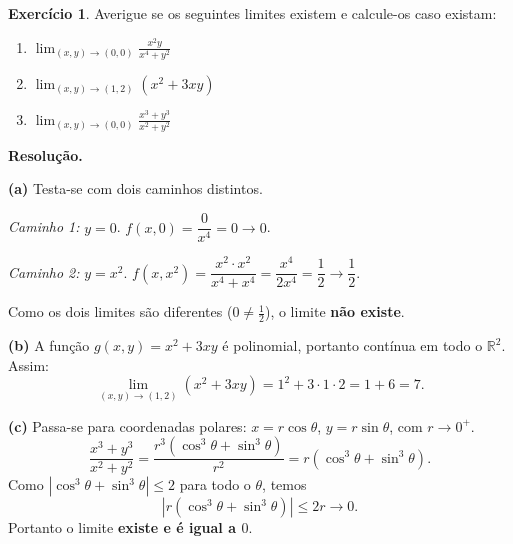 \documentclass[12pt,a4paper]{article}
\theoremstyle{definition}
\newtheorem{exercise}{Exercício}[section]
\theoremstyle{remark}
\begin{document}
\begin{exercise}
  Averigue se os seguintes limites existem e calcule-os caso existam:
  \begin{enumerate}[label=(\alph*)]
    \item $\displaystyle\lim_{(x,y)\to(0,0)}\frac{x^2 y}{x^4+y^2}$
    \item $\displaystyle\lim_{(x,y)\to(1,2)}(x^2+3xy)$
    \item $\displaystyle\lim_{(x,y)\to(0,0)}\frac{x^3+y^3}{x^2+y^2}$
  \end{enumerate}

  \medskip\textbf{Resolução.}

  \textbf{(a)} Testa-se com dois caminhos distintos.

  \emph{Caminho 1:} $y=0$. $f(x,0)=\dfrac{0}{x^4}=0\to 0$.

  \emph{Caminho 2:} $y=x^2$. $f(x,x^2)=\dfrac{x^2\cdot x^2}{x^4+x^4}=\dfrac{x^4}{2x^4}=\dfrac{1}{2}\to\dfrac{1}{2}$.

  Como os dois limites são diferentes ($0\neq\tfrac{1}{2}$), o limite
  \textbf{não existe}.

  \textbf{(b)} A função $g(x,y)=x^2+3xy$ é polinomial, portanto contínua em
  todo o $\mathbb{R}^2$. Assim:
  \[
    \lim_{(x,y)\to(1,2)}(x^2+3xy) = 1^2+3\cdot 1\cdot 2 = 1+6 = 7.
  \]

  \textbf{(c)} Passa-se para coordenadas polares: $x=r\cos\theta$,
  $y=r\sin\theta$, com $r\to 0^+$.
  \[
    \frac{x^3+y^3}{x^2+y^2}
    = \frac{r^3(\cos^3\theta+\sin^3\theta)}{r^2}
    = r(\cos^3\theta+\sin^3\theta).
  \]
  Como $|\cos^3\theta+\sin^3\theta|\leq 2$ para todo o $\theta$, temos
  \[
    \left|r(\cos^3\theta+\sin^3\theta)\right|\leq 2r\to 0.
  \]
  Portanto o limite \textbf{existe e é igual a $0$}.
\end{exercise}
\end{document}
